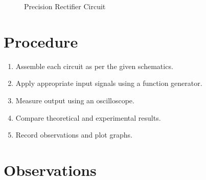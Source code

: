 \documentclass[a4paper,12pt]{article}
\begin{document}
\begin{figure}[H]
    \centering
    
    \caption{Precision Rectifier Circuit}
\end{figure}

\section*{Procedure}
\begin{enumerate}
    \item Assemble each circuit as per the given schematics.
    \item Apply appropriate input signals using a function generator.
    \item Measure output using an oscilloscope.
    \item Compare theoretical and experimental results.
    \item Record observations and plot graphs.
\end{enumerate}

\section*{Observations}
\end{document}
